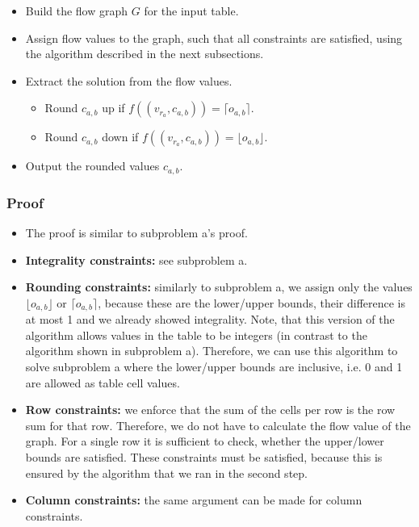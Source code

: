 \documentclass[12pt]{article}
\begin{document}
\begin{itemize}
	\item Build the flow graph $G$ for the input table.
	\item Assign flow values to the graph, such that all constraints are satisfied, using the algorithm described in the next subsections.
	\item Extract the solution from the flow values.
	\begin{itemize}
		\item Round $c_{a,b}$ up if $f((v_{r_a}, c_{a,b})) = \lceil o_{a,b} \rceil$.
		\item Round $c_{a,b}$ down if $f((v_{r_a}, c_{a,b})) = \lfloor o_{a,b} \rfloor$. 
	\end{itemize}
	\item Output the rounded values $c_{a,b}$.
\end{itemize}

\subsubsection*{Proof}
\begin{itemize}
	\item The proof is similar to subproblem a's proof.
	\item \textbf{Integrality constraints:} see subproblem a.
	\item \textbf{Rounding constraints:} similarly to subproblem a, we assign only the values $\lfloor o_{a,b} \rfloor$ or $\lceil o_{a,b} \rceil$, because these are the lower/upper bounds, their difference is at most 1 and  we already showed integrality. Note, that this version of the algorithm allows values in the table to be integers (in contrast to the algorithm shown in subproblem a). Therefore, we can use this algorithm to solve subproblem a where the lower/upper bounds are inclusive, i.e. 0 and 1  are allowed as table cell values.
	\item \textbf{Row constraints:} we enforce that the sum of the cells per row is the row sum for that row. Therefore, we do not have to calculate the flow value of the graph. For a single row it is sufficient to check, whether the upper/lower bounds are satisfied. These constraints must be satisfied, because this is ensured by the algorithm that we ran in the second step.
	\item \textbf{Column constraints:} the same argument can be made for column constraints.
\end{itemize}
\end{document}
